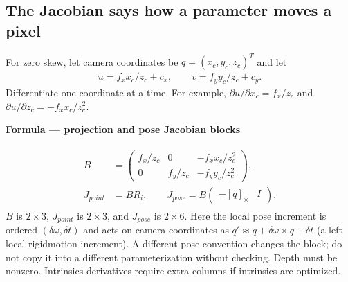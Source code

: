 \documentclass[letterpaper,11pt,english,openany,oneside]{jupyterBook}
\begin{document}
\subsection{The Jacobian says how a parameter moves a pixel}
\label{\detokenize{lectures/lecture06/optimization:the-jacobian-says-how-a-parameter-moves-a-pixel}}
\sphinxAtStartPar
For zero skew, let camera coordinates be \(q=(x_c,y_c,z_c)^T\) and let
\begin{equation*}
\begin{split}u=f_xx_c/z_c+c_x,\qquad v=f_yy_c/z_c+c_y.\end{split}
\end{equation*}
\sphinxAtStartPar
Differentiate one coordinate at a time. For example, \(\partial u/\partial x_c=f_x/z_c\) and \(\partial u/\partial z_c=-f_xx_c/z_c^2\).

\begin{TextbookBox}
\textbf{Formula — projection and pose Jacobian blocks}\par\smallskip
\begin{equation}\label{equation:lectures/lecture06/optimization:eq-lec06-jacobian}
\begin{split}\begin{aligned}
B&=\begin{pmatrix}f_x/z_c&0&-f_xx_c/z_c^2\\0&f_y/z_c&-f_yy_c/z_c^2\end{pmatrix},\\
J_{point}&=BR_i,\qquad
J_{pose}=B\begin{pmatrix}-[q]_\times&I\end{pmatrix}.
\end{aligned}\end{split}
\end{equation}
\sphinxAtStartPar
\(B\) is \(2\times3\), \(J_{point}\) is \(2\times3\), and \(J_{pose}\) is \(2\times6\). Here the local pose increment is ordered \((\delta\omega,\delta t)\) and acts on camera coordinates as \(q'\approx q+\delta\omega\times q+\delta t\) (a left local rigid\sphinxhyphen{}motion increment). A different pose convention changes the block; do not copy it into a different parameterization without checking. Depth must be nonzero. Intrinsics derivatives require extra columns if intrinsics are optimized.

\end{TextbookBox}
\end{document}
